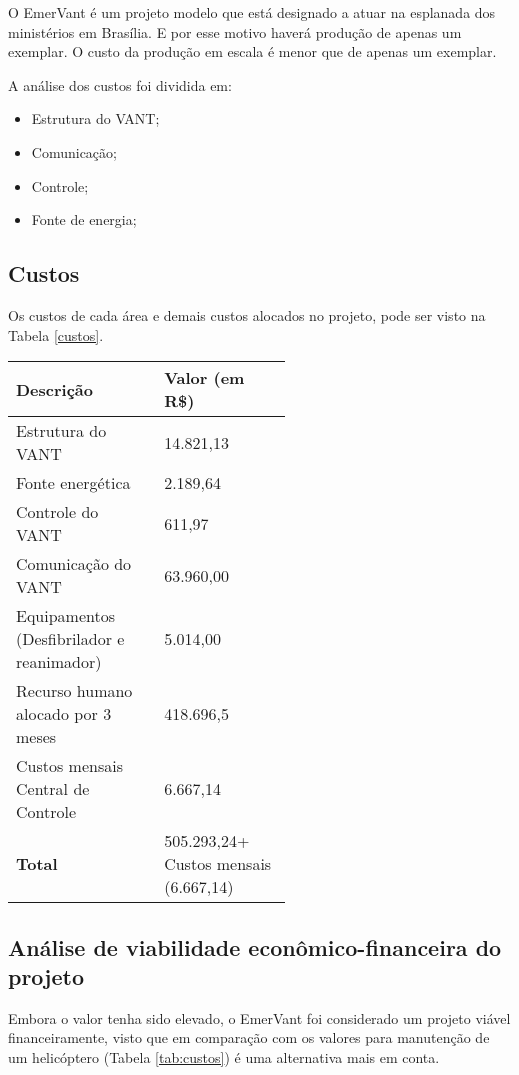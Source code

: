 
O EmerVant é um projeto modelo que está designado a atuar na esplanada dos ministérios em Brasília. E por esse motivo haverá produção de apenas um exemplar. O custo da produção em escala é menor que de apenas um exemplar. 

A análise dos custos foi dividida em:
\begin{itemize}
 \item Estrutura do VANT; 
 \item Comunicação;
 \item Controle;
  \item Fonte de energia;
\end{itemize}


\subsection{Custos}
Os custos de cada área e demais custos alocados no projeto, pode ser visto na Tabela \ref{custos}.
\vfill
\begin{table*}[!h]
\centering
    \caption{Custo do projeto}

\begin{tabular}{|p{0.30\linewidth}|p{0.25\linewidth}|}
\hline

Descrição & Valor (em R\$) \\ \hline

Estrutura do VANT & 14.821,13\\ \hline
Fonte energética & 2.189,64 \\ \hline
Controle do VANT & 611,97 \\ \hline
Comunicação do VANT & 63.960,00 \\ \hline
Equipamentos (Desfibrilador e reanimador) & 5.014,00 \\ \hline
Recurso humano alocado por 3 meses & 418.696,5\\ \hline
Custos mensais Central de Controle & 6.667,14\\ \hline
\textbf{Total} & 505.293,24\footnotemark + Custos mensais (6.667,14)\\ \hline

\end{tabular}
    \label{custos}
\end{table*}
\pagebreak

\subsection{Análise de viabilidade econômico-financeira do projeto}

  Embora o valor tenha sido elevado, o EmerVant foi considerado um projeto viável financeiramente, visto que
  em comparação com os valores para manutenção de um helicóptero (Tabela \ref{tab:custos}) é uma alternativa
  mais em conta.
